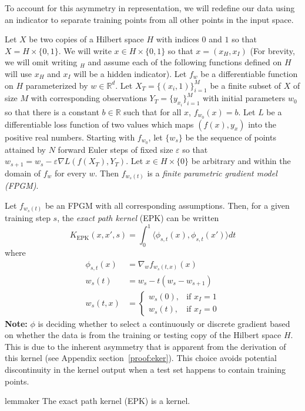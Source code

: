 To account for this asymmetry in representation, we will redefine our data using an indicator to separate training points from all other points in the input space.
\begin{definition}
\label{fpm}
Let $X$ be two copies of a Hilbert space $H$ with indices $0$ and $1$ so that $X = H \times \{0,1\}$. We will write $x \in H \times \{0,1\}$ so that $x = (x_H, x_I)$ (For brevity, we will omit writing $_H$ and assume each of the following functions defined on $H$ will use $x_H$ and $x_I$ will be a hidden indicator).
Let $ f_{w}$ be a differentiable function on $H$ parameterized by $w \in \mathbb{R}^d$. Let $X_T = \{(x_i, 1)\}_{i=1}^M$ be a finite subset of $X$ of size $M$ with corresponding observations $Y_T = \{y_{x_i}\}_{i=1}^M$ with initial parameters $w_0$ so that there is a constant $b \in \mathbb{R}$ such that for all $x$, $ f_{w_0}(x) = b$. Let $L$ be a differentiable loss function of two values which maps $(f(x), y_x)$ into the positive real numbers. Starting with $f_{w_0}$, let $\{w_s\}$ be the sequence of points attained by $N$ forward Euler steps of fixed size $\varepsilon$ so that $w_{s+1} = w_{s} - \varepsilon \nabla L(f(X_T), Y_T)$. Let $x \in H \times \{0\}$ be arbitrary and within the domain of $f_w$ for every $w$. Then $f_{w_s(t)}$ is a \emph{finite parametric gradient model (FPGM)}. 
\end{definition}

\begin{definition}
\label{epk}

Let $f_{w_s(t)}$ be an FPGM with all corresponding assumptions. Then, for a given training step $s$, the \emph{exact path kernel} (EPK) can be written  
\begin{equation}
 K_{\text{EPK}}(x, x', s) = \int_0^1\langle \phi_{s,t}(x), \phi_{s,t}(x')\rangle dt
 \label{eq2}
\end{equation}
where
\begin{align}
\phi_{s, t}(x) &=  \nabla_w f_{w_s(t,x)} (x)\\
w_s(t) &= w_s - t(w_s - w_{s+1})\\
w_s(t,x) &= \begin{cases} w_s(0), & \text{if } x_I = 1\\ w_s(t), & \text{if } x_I = 0 \end{cases}
\end{align}
\textbf{Note:} $\phi$ is deciding whether to select a continuously or discrete gradient based on whether the data is from the training or testing copy of the Hilbert space $H$. This is due to the inherent asymmetry that is apparent from the derivation of this kernel (see Appendix section~\ref{proof:eker}). This choice avoids potential discontinuity in the kernel output when a test set happens to contain training points. 
\end{definition}
\begin{restatable}{lemma}{ker}
The exact path kernel (EPK) is a kernel.
\end{restatable}

